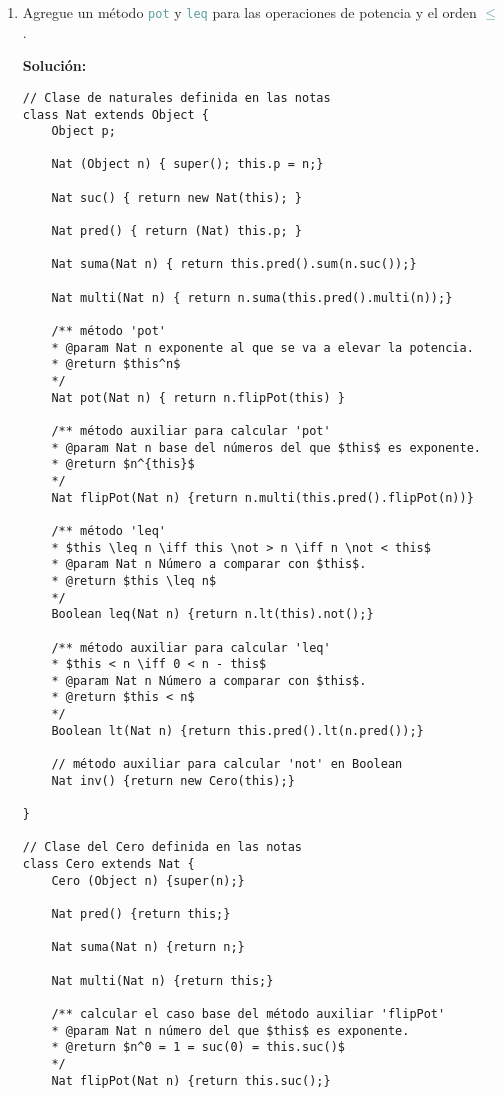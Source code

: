 \documentclass{article}
\newcommand{\tp}[1]{\textcolor{CadetBlue} {\texttt{#1}}}
\newcommand{\tb}[1]{\textcolor{RoyalPurple} {\textbf{#1}}}
\begin{document}
\begin{enumerate}
        \begin{enumerate}
            \item Agregue un método \tp{pot} y \tp{leq} para las operaciones de
            potencia y el orden \tp{$\leq$}.

            \tb{Solución:}

            \begin{verbatim}
// Clase de naturales definida en las notas
class Nat extends Object {
    Object p;

    Nat (Object n) { super(); this.p = n;}

    Nat suc() { return new Nat(this); }

    Nat pred() { return (Nat) this.p; }

    Nat suma(Nat n) { return this.pred().sum(n.suc());}

    Nat multi(Nat n) { return n.suma(this.pred().multi(n));}

    /** método 'pot'
    * @param Nat n exponente al que se va a elevar la potencia.
    * @return $this^n$
    */
    Nat pot(Nat n) { return n.flipPot(this) }

    /** método auxiliar para calcular 'pot'
    * @param Nat n base del números del que $this$ es exponente.
    * @return $n^{this}$
    */
    Nat flipPot(Nat n) {return n.multi(this.pred().flipPot(n))}

    /** método 'leq'
    * $this \leq n \iff this \not > n \iff n \not < this$
    * @param Nat n Número a comparar con $this$.
    * @return $this \leq n$
    */
    Boolean leq(Nat n) {return n.lt(this).not();}

    /** método auxiliar para calcular 'leq'
    * $this < n \iff 0 < n - this$
    * @param Nat n Número a comparar con $this$.
    * @return $this < n$
    */
    Boolean lt(Nat n) {return this.pred().lt(n.pred());}

    // método auxiliar para calcular 'not' en Boolean
    Nat inv() {return new Cero(this);}

}

// Clase del Cero definida en las notas
class Cero extends Nat {
    Cero (Object n) {super(n);}

    Nat pred() {return this;}

    Nat suma(Nat n) {return n;}

    Nat multi(Nat n) {return this;}

    /** calcular el caso base del método auxiliar 'flipPot'
    * @param Nat n número del que $this$ es exponente.
    * @return $n^0 = 1 = suc(0) = this.suc()$
    */
    Nat flipPot(Nat n) {return this.suc();}


\end{verbatim}
\end{enumerate}
\end{enumerate}
\end{document}
